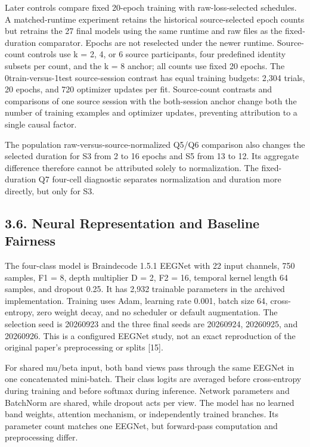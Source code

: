 \documentclass[11pt]{article}
\begin{document}
Later controls compare fixed 20-epoch training with raw-loss-selected schedules. A matched-runtime experiment retains the historical source-selected epoch counts but retrains the 27 final models using the same runtime and raw files as the fixed-duration comparator. Epochs are not reselected under the newer runtime. Source-count controls use k = 2, 4, or 6 source participants, four predefined identity subsets per count, and the k = 8 anchor; all counts use fixed 20 epochs. The 0train-versus-1test source-session contrast has equal training budgets: 2,304 trials, 20 epochs, and 720 optimizer updates per fit. Source-count contrasts and comparisons of one source session with the both-session anchor change both the number of training examples and optimizer updates, preventing attribution to a single causal factor.

The population raw-versus-source-normalized Q5/Q6 comparison also changes the selected duration for S3 from 2 to 16 epochs and S5 from 13 to 12. Its aggregate difference therefore cannot be attributed solely to normalization. The fixed-duration Q7 four-cell diagnostic separates normalization and duration more directly, but only for S3.

\subsection*{3.6. Neural Representation and Baseline Fairness}
The four-class model is Braindecode 1.5.1 EEGNet with 22 input channels, 750 samples, F1 = 8, depth multiplier D = 2, F2 = 16, temporal kernel length 64 samples, and dropout 0.25. It has 2,932 trainable parameters in the archived implementation. Training uses Adam, learning rate 0.001, batch size 64, cross-entropy, zero weight decay, and no scheduler or default augmentation. The selection seed is 20260923 and the three final seeds are 20260924, 20260925, and 20260926. This is a configured EEGNet study, not an exact reproduction of the original paper's preprocessing or splits [15].

For shared mu/beta input, both band views pass through the same EEGNet in one concatenated mini-batch. Their class logits are averaged before cross-entropy during training and before softmax during inference. Network parameters and BatchNorm are shared, while dropout acts per view. The model has no learned band weights, attention mechanism, or independently trained branches. Its parameter count matches one EEGNet, but forward-pass computation and preprocessing differ.
\end{document}
